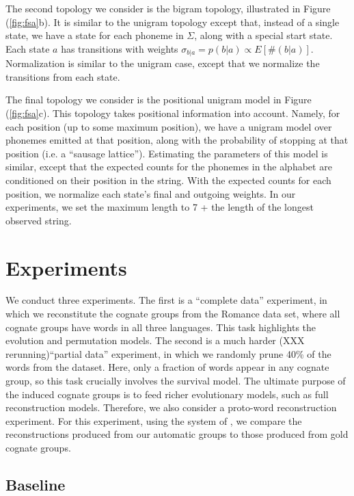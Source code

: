 \documentclass[11pt,a4paper]{article}
\begin{document}
The second topology we consider is the bigram topology, illustrated
in Figure (\ref{fig:fsa}b). It is similar to the unigram topology
except that, instead of a single state, we have a state for each
phoneme in $\Sigma$, along with a special start state. Each state
$a$ has transitions with weights $\sigma_{b|a}= p(b|a) \propto
E[\#(b|a)]$. Normalization is similar to the unigram case, except
that we normalize the transitions from each state.

The final topology we consider is the positional unigram model in
Figure (\ref{fig:fsa}c). This topology takes positional information
into account. Namely, for each position (up to some maximum position),
we have a unigram model over phonemes emitted at that position,
along with the probability of stopping at that position (i.e. a
``sausage lattice''). Estimating the parameters of this model is
similar, except that the expected counts for the phonemes in the
alphabet are conditioned on their position in the string. With the
expected counts for each position, we normalize each state's final
and outgoing weights. In our experiments, we set the maximum length
to 7 + the length of the longest observed string.

\section{Experiments}

We conduct three experiments. The first is a ``complete data''
experiment, in which we reconstitute the cognate groups from the
Romance data set, where all cognate groups have words in all three
languages.  This task highlights the evolution and permutation
models.  The second is a much harder (XXX rerunning)``partial data'' experiment,
in which we randomly prune 40\% of the words from the dataset.
Here, only a fraction of words appear in any cognate group,
so this task crucially involves the survival model.  The ultimate
purpose of the induced cognate groups is to feed richer evolutionary
models, such as full reconstruction models.  Therefore, we also
consider a proto-word reconstruction experiment.  For this experiment,
using the system of , we compare the
reconstructions produced from our automatic groups to those produced
from gold cognate groups.

\subsection{Baseline}
\label{sec:baseline}
\end{document}
